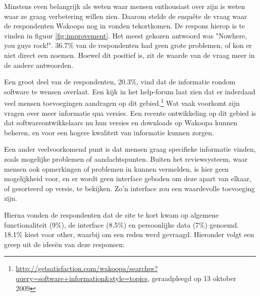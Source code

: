       Minstens even belangrijk als weten waar mensen enthousiast over zijn is weten waar ze graag verbetering willen zien. Daarom stelde de enqu\^ete de vraag waar de respondenten Wakoopa nog in vonden tekortkomen. De respons hierop is te vinden in figuur \ref{fig:improvement}. Het meest gekozen antwoord was "Nowhere, you guys rock!". 36.7\% van de respondenten had geen grote problemen, of kon er niet direct een noemen. Hoewel dit positief is, zit de waarde van de vraag meer in de andere antwoorden.

      Een groot deel van de respondenten, 20.3\%, vind dat de informatie rondom software te wensen overlaat. Een kijk in het help-forum laat zien dat er inderdaad veel mensen toevoegingen aandragen op dit gebied.\footnote{\url{http://getsatisfaction.com/wakoopa/searches?query=software+information&style=topics}, geraadpleegd op 13 oktober 2009} Wat vaak voorkomt zijn vragen over meer informatie qua versies. Een recente ontwikkeling op dit gebied is dat softwareontwikkelaars nu hun versies en downloads op Wakoopa kunnen beheren, en voor een hogere kwaliteit van informatie kunnen zorgen.

      Een ander veelvoorkomend punt is dat mensen graag specifieke informatie vinden, zoals mogelijke problemen of aandachtspunten. Buiten het reviewsysteem, waar mensen ook opmerkingen of problemen in kunnen vermelden, is hier geen mogelijkheid voor, en er wordt geen interface geboden om deze apart van elkaar, of gesorteerd op versie, te bekijken. Zo'n interface zou een waardevolle toevoeging zijn.


      Hierna vonden de respondenten dat de site te kort kwam op algemene functionaliteit (9\%), de interface (8.5\%) en persoonlijke data (7\%) genoemd. 18.1\% kiest voor other, waarbij om een reden werd gevraagd. Hieronder volgt een greep uit de idee\"en van deze responsen:

